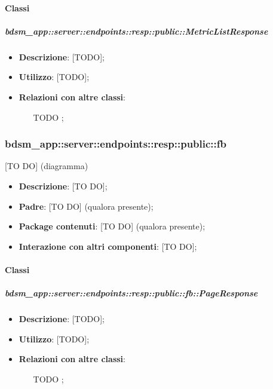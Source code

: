 	\paragraph{Classi} %

    \subparagraph{bdsm\_app::server::endpoints::resp::public::MetricListResponse} %
    \label{subp:bdsm_app_server_endpoints_resp_public_metriclistresponse}
    \begin{itemize}
      \item \textbf{Descrizione}: [TODO];
      \item \textbf{Utilizzo}: [TODO];
      \item \textbf{Relazioni con altre classi}:
        \begin{itemize}
          \item [TODO];
        \end{itemize}
      \end{itemize}

\subsubsection{bdsm\_app::server::endpoints::resp::public::fb} %
\label{ssub:bdsm_app_server_endpoints_resp_public_fb}
[TO DO] (diagramma) \newline \newline

\begin{itemize}
  \item \textbf{Descrizione}: [TO DO];
  \item \textbf{Padre}: [TO DO] (qualora presente);
  \item \textbf{Package contenuti}: [TO DO] (qualora presente);
  \item \textbf{Interazione con altri componenti}: [TO DO];
\end{itemize}

	\paragraph{Classi} %

    \subparagraph{bdsm\_app::server::endpoints::resp::public::fb::PageResponse} %
    \label{subp:bdsm_app_server_endpoints_resp_public_fb_pageresponse}
    \begin{itemize}
      \item \textbf{Descrizione}: [TODO];
      \item \textbf{Utilizzo}: [TODO];
      \item \textbf{Relazioni con altre classi}:
        \begin{itemize}
          \item [TODO];
        \end{itemize}
      \end{itemize}
    
